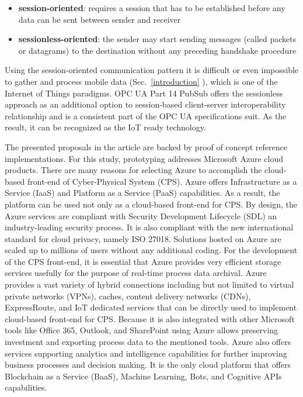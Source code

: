 \documentclass[runningheads]{llncs}
\begin{document}
\begin{itemize}
      \item \textbf{session-oriented}: requires a session that has to be established before any data can be sent between sender and receiver
      \item \textbf{sessionless-oriented}: the sender may start sending messages (called packets or datagrams) to the destination without any preceding handshake procedure
\end{itemize}

Using the session-oriented communication pattern it is difficult or even impossible to gather and process mobile data (Sec.~\ref{introduction} ), which is one of the Internet of Things paradigms. OPC UA Part 14 PubSub \cite{RefWorks:doc:5d98837de4b055984c0eecf0, UAPart14PubSubMainTechnologyFeatures} offers the sessionless approach as an additional option to session-based client-server interoperability relationship and is a consistent part of the OPC UA specifications suit. As the result, it can be recognized as the IoT ready technology.

The presented proposals in the article are backed by proof of concept reference implementations\cite{mariusz_postol_2020_4361640}. For this study, prototyping addresses Microsoft Azure cloud products. There are many reasons for selecting Azure to accomplish the cloud-based front-end of Cyber-Physical System (CPS). Azure offers Infrastructure as a Service (IaaS) and Platform as a Service (PaaS) capabilities. As a result, the platform can be used not only as a cloud-based front-end for CPS. By design, the Azure services are compliant with Security Development Lifecycle (SDL) an industry-leading security process. It is also compliant with the new international standard for cloud privacy, namely ISO 27018. Solutions hosted on Azure are scaled up to millions of users without any additional coding. For the development of the CPS front-end, it is essential that Azure provides very efficient storage services usefully for the purpose of real-time process data archival. Azure provides a vast variety of hybrid connections including but not limited to virtual private networks (VPNs), caches, content delivery networks (CDNs), ExpressRoute, and IoT dedicated services that can be directly used to implement cloud-based front-end for CPS. Because it is also integrated with other Microsoft tools like Office 365, Outlook, and SharePoint using Azure allows preserving investment and exporting process data to the mentioned tools. Azure also offers services supporting analytics and intelligence capabilities for further improving business processes and decision making. It is the only cloud platform that offers Blockchain as a Service (BaaS), Machine Learning, Bots, and Cognitive APIs capabilities.
\end{document}
